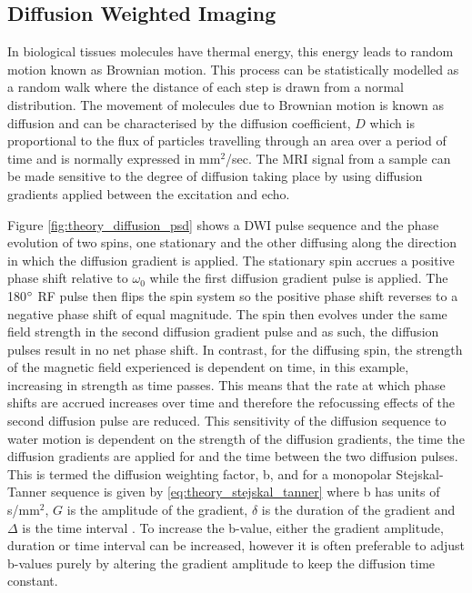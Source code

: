 
\subsection{Diffusion Weighted Imaging}
\label{subsec:theory_diffusion}
In biological tissues molecules have thermal energy, this energy leads to random motion known as Brownian motion. This process can be statistically modelled as a random walk where the distance of each step is drawn from a normal distribution. The movement of molecules due to Brownian motion is known as diffusion and can be characterised by the diffusion coefficient, $D$ which is proportional to the flux of particles travelling through an area over a period of time and is normally expressed in mm$^2$/sec. The \ac{MRI} signal from a sample can be made sensitive to the degree of diffusion taking place by using diffusion gradients applied between the excitation and echo. 

Figure \ref{fig:theory_diffusion_psd} shows a \ac{DWI} pulse sequence and the phase evolution of two spins, one stationary and the other diffusing along the direction in which the diffusion gradient is applied. The stationary spin accrues a positive phase shift relative to $\omega_0$ while the first diffusion gradient pulse is applied. The 180$\degree$ \ac{RF} pulse then flips the spin system so the positive phase shift reverses to a negative phase shift of equal magnitude. The spin then evolves under the same field strength in the second diffusion gradient pulse and as such, the diffusion pulses result in no net phase shift. In contrast, for the diffusing spin, the strength of the magnetic field experienced is dependent on time, in this example, increasing in strength as time passes. This means that the rate at which phase shifts are accrued increases over time and therefore the refocussing effects of the second diffusion pulse are reduced. This sensitivity of the diffusion sequence to water motion is dependent on the strength of the diffusion gradients, the time the diffusion gradients are applied for and the time between the two diffusion pulses. This is termed the diffusion weighting factor, b, and for a monopolar Stejskal-Tanner sequence is given by \eqref{eq:theory_stejskal_tanner} where b has units of s/mm$^2$, $G$ is the amplitude of the gradient, $\delta$ is the duration of the gradient and $\Delta$ is the time interval \cite{stejskal_spin_1965}. To increase the b-value, either the gradient amplitude, duration or time interval can be increased, however it is often preferable to adjust b-values purely by altering the gradient amplitude to keep the diffusion time constant.

